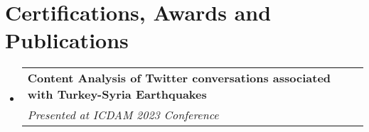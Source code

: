 \documentclass[letterpaper,11pt]{article}
\makeatletter
\newcommand{\resumeSubheading}[4]{
  \vspace{-1pt}\item
    \begin{tabular*}{0.97\textwidth}[t]{l@{\extracolsep{\fill}}r}
      \textbf{#1} & #2 \\
      \textit{\small#3} & \textit{\small #4} \\
    \end{tabular*}\vspace{-5pt}
}
\newcommand{\resumeSubHeadingListStart}{\begin{itemize}[leftmargin=*]}
\newcommand{\resumeSubHeadingListEnd}{\end{itemize}}
\makeatother
\begin{document}
\section{Certifications, Awards and Publications}
\resumeSubHeadingListStart
\resumeSubheading
{Content Analysis of Twitter conversations associated with Turkey-Syria Earthquakes}{}
{Presented at ICDAM 2023 Conference}{}
\resumeSubHeadingListEnd



\end{document}

